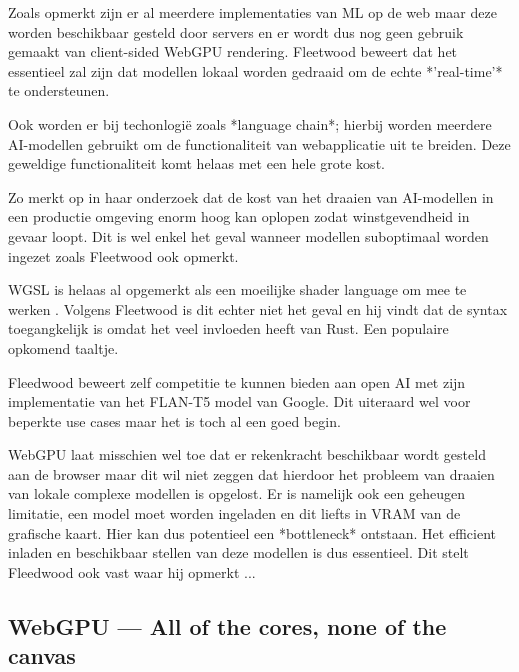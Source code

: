 Zoals \textcite{Fleetwood2023a} opmerkt zijn er al meerdere implementaties van ML op de web maar deze worden beschikbaar gesteld door servers en er wordt dus nog geen gebruik gemaakt van client-sided WebGPU rendering. Fleetwood beweert dat het essentieel zal zijn dat modellen lokaal worden gedraaid om de echte *'real-time'* te ondersteunen.

\bigbreak{}

Ook worden er bij techonlogië zoals *language chain*; hierbij worden meerdere AI-modellen gebruikt om de functionaliteit van webapplicatie uit te breiden. Deze geweldige functionaliteit komt helaas met een hele grote kost.

\bigbreak{}

Zo merkt \textcite{Huyen2023} op in haar onderzoek dat de kost van het draaien van AI-modellen in een productie omgeving enorm hoog kan oplopen zodat winstgevendheid in gevaar loopt. Dit is wel enkel het geval wanneer modellen suboptimaal worden ingezet zoals Fleetwood ook opmerkt.

\bigbreak{}

WGSL is helaas al opgemerkt als een moeilijke shader language om mee te werken \textcite{Madrigal2023}. Volgens Fleetwood is dit echter niet het geval en hij vindt dat de syntax toegangkelijk is omdat het veel invloeden heeft van Rust. Een populaire opkomend taaltje.

\bigbreak{}

Fleedwood beweert zelf competitie te kunnen bieden aan open AI met zijn implementatie van het FLAN-T5 model van Google. Dit uiteraard wel voor beperkte use cases maar het is toch al een goed begin.

\bigbreak{}

WebGPU laat misschien wel toe dat er rekenkracht beschikbaar wordt gesteld aan de browser maar dit wil niet zeggen dat hierdoor het probleem van draaien van lokale complexe modellen is opgelost. Er is namelijk ook een geheugen limitatie, een model moet worden ingeladen en dit liefts in VRAM van de grafische kaart. Hier kan dus potentieel een *bottleneck* ontstaan. Het efficient inladen en beschikbaar stellen van deze modellen is dus essentieel. Dit stelt Fleedwood ook vast waar hij opmerkt ... 

\subsection{WebGPU — All of the cores, none of the canvas}

